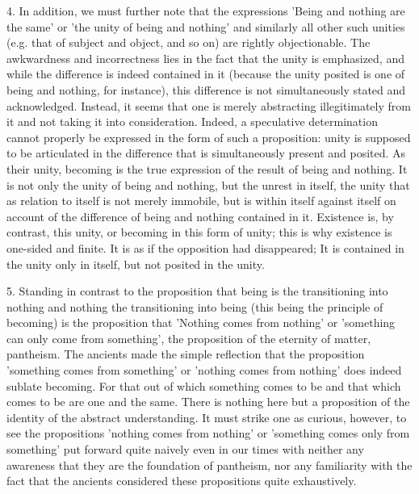     4. In addition, we must further note that the expressions
    'Being and nothing are the same' or
    'the unity of being and nothing' and
    similarly all other such unities
    (e.g. that of subject and object, and so on)
    are rightly objectionable.
    The awkwardness and incorrectness lies in
    the fact that the unity is emphasized,
    and while the difference is indeed contained in it
    (because the unity posited is one of being and nothing, for instance),
    this difference is not simultaneously stated and acknowledged.
    Instead, it seems that one is merely
    abstracting illegitimately from it
    and not taking it into consideration.
    Indeed, a speculative determination cannot properly be
    expressed in the form of such a proposition:
    unity is supposed to be articulated in the difference
    that is simultaneously present and posited.
    As their unity, becoming is the true expression of
    the result of being and nothing.
    It is not only the unity of being and nothing,
    but the unrest in itself,
    the unity that as relation to itself is
    not merely immobile,
    but is within itself against itself
    on account of the difference of
    being and nothing contained in it.
    Existence is, by contrast, this unity, or
    becoming in this form of unity;
    this is why existence is one-sided and finite.
    It is as if the opposition had disappeared;
    It is contained in the unity only in itself,
    but not posited in the unity.

    5. Standing in contrast to the proposition
    that being is the transitioning into nothing
    and nothing the transitioning into being
    (this being the principle of becoming)
    is the proposition that 'Nothing comes from nothing'
    or 'something can only come from something',
    the proposition of the eternity of matter, pantheism.
    The ancients made the simple reflection
    that the proposition
    'something comes from something' or
    'nothing comes from nothing'
    does indeed sublate becoming.
    For that out of which something comes to be and
    that which comes to be are one and the same.
    There is nothing here but a proposition of
    the identity of the abstract understanding.
    It must strike one as curious, however,
    to see the propositions
    'nothing comes from nothing' or
    'something comes only from something'
    put forward quite naively even in our times
    with neither any awareness that
    they are the foundation of pantheism,
    nor any familiarity with the fact that the ancients
    considered these propositions quite exhaustively.

